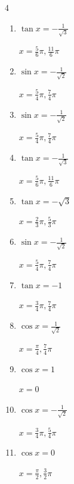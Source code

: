 \begin{multicols}{4}
\begin{enumerate}
        $\displaystyle x = \frac{\pi}{4} , \frac{7}{4}\pi$

  \item $\displaystyle \tan{x}  = -\frac{1}{\sqrt{3}}$

        $\displaystyle x = \frac{5}{6}\pi , \frac{11}{6}\pi$

  \item $\displaystyle \sin{x}  = -\frac{1}{\sqrt{2}}$

        $\displaystyle x = \frac{5}{4}\pi , \frac{7}{4}\pi$

\columnbreak %

  \item $\displaystyle \sin{x}  = -\frac{1}{\sqrt{2}}$

        $\displaystyle x = \frac{5}{4}\pi , \frac{7}{4}\pi$

  \item $\displaystyle \tan{x}  = -\frac{1}{\sqrt{3}}$

        $\displaystyle x = \frac{5}{6}\pi , \frac{11}{6}\pi$

  \item $\displaystyle \tan{x}  = -\sqrt{3}$

        $\displaystyle x = \frac{2}{3}\pi , \frac{5}{3}\pi$

  \item $\displaystyle \sin{x}  = -\frac{1}{\sqrt{2}}$

        $\displaystyle x = \frac{5}{4}\pi , \frac{7}{4}\pi$

  \item $\displaystyle \tan{x}  = -1$

        $\displaystyle x = \frac{3}{4}\pi , \frac{7}{4}\pi$

  \item $\displaystyle \cos{x}  = \frac{1}{\sqrt{2}}$

        $\displaystyle x = \frac{\pi}{4} , \frac{7}{4}\pi$

  \item $\displaystyle \cos{x}  = 1$

        $\displaystyle x = 0$

  \item $\displaystyle \cos{x}  = -\frac{1}{\sqrt{2}}$

        $\displaystyle x = \frac{3}{4}\pi , \frac{5}{4}\pi$

  \item $\displaystyle \cos{x}  = 0$

        $\displaystyle x = \frac{\pi}{2} , \frac{3}{2}\pi$


\end{enumerate}
\end{multicols}
